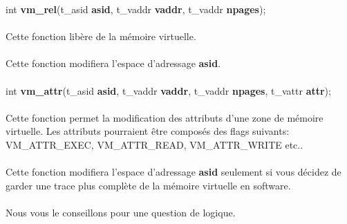 \documentclass[10pt,a4wide]{article}
\begin{document}
\hspace{1.5cm}int \textbf{vm\_rel}(t\_asid \textbf{asid},
                                   t\_vaddr \textbf{vaddr},
                                   t\_vaddr \textbf{npages});

\paragraph{}

Cette fonction lib\`ere de la m\'emoire virtuelle.

\paragraph{}

Cette fonction modifiera l'espace d'adressage \textbf{asid}.

\paragraph{}

\hspace{1.5cm}int \textbf{vm\_attr}(t\_asid \textbf{asid},
                                    t\_vaddr \textbf{vaddr},
                                    t\_vaddr \textbf{npages},
                                    t\_vattr \textbf{attr});

\paragraph{}

Cette fonction permet la modification des attributs d'une zone de
m\'emoire virtuelle. Les attributs pourraient \^etre compos\'es
des flags suivants: VM\_ATTR\_EXEC, VM\_ATTR\_READ, VM\_ATTR\_WRITE etc..

\paragraph{}

Cette fonction modifiera l'espace d'adressage \textbf{asid} seulement si
vous d\'ecidez de garder une trace plus compl\`ete de la m\'emoire virtuelle
en software.

\paragraph{}

Nous vous le conseillons pour une question de logique.
\end{document}
